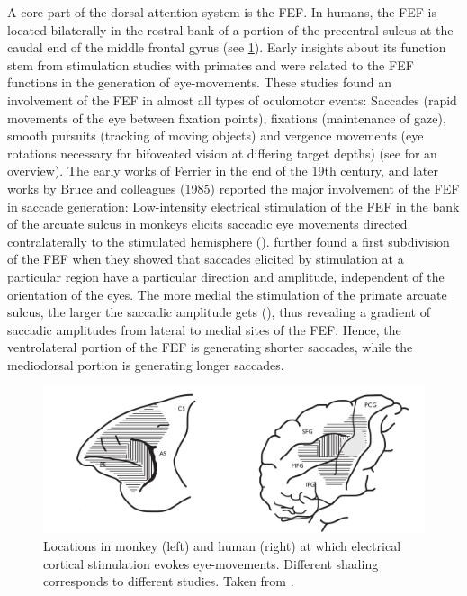 \documentclass[a4paper, 12pt]{scrreprt}
\begin{document}
A core part of the dorsal attention system is the FEF. In humans, the FEF is located bilaterally in the rostral bank of a portion of the precentral sulcus at the caudal end of the middle frontal gyrus (see \ref{fig:FEF_reg}). Early insights about its function stem from stimulation studies with primates and were related to the FEF functions in the generation of eye-movements. These studies found an involvement of the FEF in almost all types of oculomotor events: Saccades (rapid movements of the eye between fixation points), fixations (maintenance of gaze), smooth pursuits (tracking of moving objects) and vergence movements (eye rotations necessary for bifoveated vision at differing target depths) (see \textcite{krauzlis2014eye} for an overview). The early works of Ferrier in the end of the 19th century, and later works by Bruce and colleagues (1985) reported the major involvement of the FEF in saccade generation: Low-intensity electrical stimulation of the FEF in the bank of the arcuate sulcus in monkeys elicits saccadic eye movements directed contralaterally to the stimulated hemisphere (\cite{tehovnik2000eye}). \textcite{bruce1985primate} further found a first subdivision of the FEF when they showed that saccades elicited by stimulation at a particular region have a particular direction and amplitude, independent of the orientation of the eyes. The more medial the stimulation of the primate arcuate sulcus, the larger the saccadic amplitude gets (\cite{bruce1985primate}), thus revealing a gradient of saccadic amplitudes from lateral to medial sites of the FEF. Hence, the ventrolateral portion of the FEF is generating shorter saccades, while the mediodorsal portion is generating longer saccades. 

\begin{figure}[H]
	\includegraphics[scale=0.3]{img/FEF.png}
	\caption[Anatomical location of the FEF]{\small{Locations in monkey (left) and human (right) at which electrical cortical stimulation evokes eye-movements. Different shading corresponds to different studies. Taken from \textcite{blanke2000FEF}.}}
	\label{fig:FEF_reg}
\end{figure}
\end{document}
